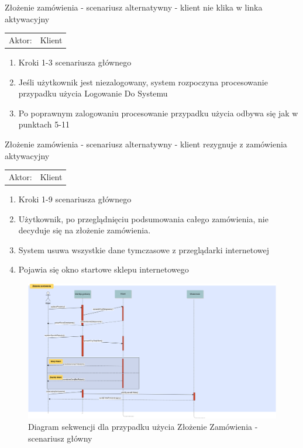   
  \item Złożenie zamówienia - scenariusz alternatywny - klient nie klika w linka
aktywacyjny
   \begin{tabularx}{\linewidth}{ c X}
	Aktor: & Klient \\
  	\end{tabularx}   
  	\begin{enumerate}
  	  \item Kroki 1-3 scenariusza głównego
  	  \item Jeśli użytkownik jest niezalogowany, system rozpoczyna procesowanie
  	  przypadku użycia Logowanie Do Systemu
  	  \item Po poprawnym zalogowaniu procesowanie przypadku użycia odbywa się jak
  	  w punktach 5-11
  	\end{enumerate}
  	
  	
  	\item Złożenie zamówienia - scenariusz alternatywny - klient rezygnuje z
  	zamówienia aktywacyjny
   \begin{tabularx}{\linewidth}{ c X}
	Aktor: & Klient \\
  	\end{tabularx}   
  	\begin{enumerate}
  	  \item Kroki 1-9 scenariusza głównego
  	  \item Użytkownik, po przeglądnięciu podsumowania całego zamówienia, nie
  	  decyduje się na złożenie zamówienia.
  	  \item System usuwa wszystkie dane tymczasowe z przeglądarki internetowej
  	  \item Pojawia się okno startowe sklepu internetowego
  	\end{enumerate}
  	
  	
   	
\begin{figure}[h!]
    \includegraphics[width=\textwidth,
    height=0.5\textheight]{graphics/UseCase/Klient/ZlozenieZamowieniaSD.png}
  \caption{Diagram sekwencji dla przypadku użycia Złożenie Zamówienia -
  scenariusz główny}
\end{figure}